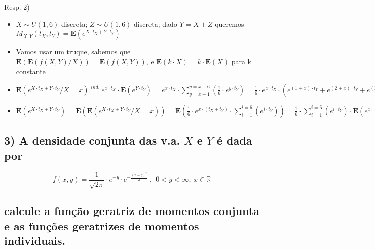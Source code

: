\documentclass[english]{article}
\begin{document}
Resp. 2)
\begin{itemize}
\item $X\sim U(1,6)$ discreta; $Z\sim U(1,6)$ discreta; dado $Y=X+Z$
queremos $M_{X,Y}(t_{X},t_{Y})=\mathbf{E}(e^{X\cdot t_{X}+Y\cdot t_{Y}})$
\item Vamos usar um truque, sabemos que $\mathbf{E}(\mathbf{E}(f(X,Y)/X))=\mathbf{E}(f(X,Y))$,
e $\mathbf{E}(k\cdot X)=k\cdot\mathbf{E}(X)$ para k constante
\item $\mathbf{E}(e^{X\cdot t_{X}+Y\cdot t_{Y}}/X=x)\overset{ind.}{=}e^{x\cdot t_{X}}\cdot\mathbf{E}(e^{Y\cdot t_{Y}})=e^{x\cdot t_{X}}\cdot\sum_{y=x+1}^{y=x+6}(\frac{1}{6}\cdot e^{y\cdot t_{Y}})=\frac{1}{6}\cdot e^{x\cdot t_{X}}\cdot(e^{(1+x)\cdot t_{Y}}+e^{(2+x)\cdot t_{Y}}+e^{(3+x)\cdot t_{Y}}+e^{(4+x)\cdot t_{Y}}+e^{(5+x)\cdot t_{Y}}+e^{(6+x)\cdot t_{Y}})=\frac{1}{6}\cdot e^{x\cdot(t_{X}+t_{Y})}\cdot\sum_{i=1}^{i=6}(e^{i\cdot t_{Y}})$
\item $\mathbf{E}(e^{X\cdot t_{X}+Y\cdot t_{Y}})=\mathbf{E}(\mathbf{E}(e^{X\cdot t_{X}+Y\cdot t_{Y}}/X=x))=\mathbf{E}(\frac{1}{6}\cdot e^{x\cdot(t_{X}+t_{Y})}\cdot\sum_{i=1}^{i=6}(e^{i\cdot t_{Y}}))=\frac{1}{6}\cdot\sum_{i=1}^{i=6}(e^{i\cdot t_{Y}})\cdot\mathbf{E}(e^{x\cdot(t_{X}+t_{Y})})=\frac{1}{6}\cdot\sum_{i=1}^{i=6}(e^{i\cdot t_{Y}})\cdot\sum_{x=1}^{x=6}(e^{x\cdot(t_{X}+t_{Y})})\cdot\frac{1}{6}=\frac{1}{36}\cdot\sum_{i=1}^{i=6}\sum_{x=1}^{x=6}(e^{i\cdot t_{Y}+x\cdot(t_{X}+t_{Y})})$
\end{itemize}

\subsection*{\textcompwordmark{}}


\subsection*{\textmd{3) A densidade conjunta das v.a. $X$ e $Y$ é dada por}}

\[
f(x,y)=\frac{1}{\sqrt{2\pi}}\cdot e^{-y}\cdot e^{-\frac{(x-y)^{2}}{2}}\ ,\ \ 0<y<\infty,\ x\in\mathbb{R}
\]



\subsection*{\textmd{calcule a função geratriz de momentos conjunta e as funções
geratrizes de momentos individuais.}}
\end{document}

